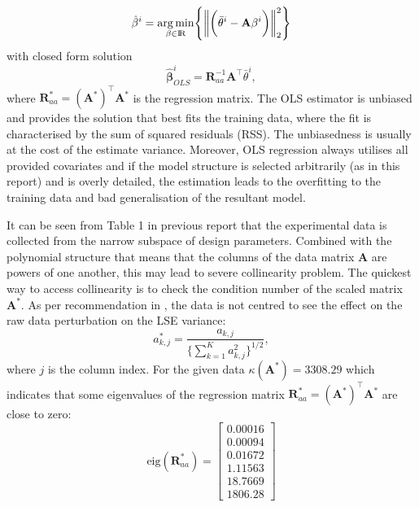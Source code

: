 \documentclass[a4paper,11pt,twoside]{article}
\newcommand{\norm}[1]{\left\lVert#1\right\rVert}
\DeclareMathOperator{\R}{\rm I\!R}
\theoremstyle{mytheoremstyle}
\begin{document}
\begin{equation}
\hat{\mathbf{\beta}}^i = \underset{\beta \in \R}{\arg \min} \Biggl\{\norm{ \biggl(\bar{\theta}^i - \mathbf{A} \mathbf{\beta}^i \biggr) }^{2}_{2}\Biggr\}
\end{equation}
with closed form solution
\begin{equation}
\hat{\mathbf{\beta}}^{i}_{OLS} = \mathbf{R}^{-1}_{aa} \mathbf{A}^{\top}\bar{\theta}^i,  
\end{equation} 
where $\mathbf{R}^{\ast}_{aa} = (\mathbf{A}^\ast)^{\top}\mathbf{A}^\ast$ is the regression matrix. The OLS estimator is unbiased and provides the solution that best fits the training data, where the fit is characterised by the sum of squared residuals (RSS). The unbiasedness is usually at the cost of the estimate variance. Moreover, OLS regression always utilises all provided covariates and if the model structure is selected arbitrarily (as in this report) and is overly detailed, the estimation leads to the overfitting to the training data and bad generalisation of the resultant model.
\par It can be seen from Table 1 in previous report that the experimental data is collected from the narrow subspace of design parameters. Combined with the polynomial structure that means that the columns of the data matrix $\mathbf{A} $ are powers of one another, this may lead to severe collinearity problem. The quickest way to access collinearity is to check the condition number of the scaled matrix $\mathbf{A}^\ast$. As per recommendation in \cite{Seber2003}, the data is not centred to see the effect on the raw data perturbation on the LSE variance:
\begin{equation*}
a^{\ast}_{k,j} = \frac{a_{k,j}}{\Big\{ \sum^{K}_{k=1} a^{2}_{k,j}\Big\}^{1/2}}, 
\end{equation*}
where $j$ is the column index.
For the given data $\kappa(\mathbf{A}^\ast) = 3308.29$ which indicates that some eigenvalues of the regression matrix $\mathbf{R}^{\ast}_{aa} = (\mathbf{A}^\ast)^{\top}\mathbf{A}^\ast$ are close to zero:
\begin{equation*}
\text{eig}(\mathbf{R}^{\ast}_{aa}) = \left[\begin{array}{r}
0.00016 \\
0.00094\\
0.01672\\
1.11563\\
18.7669\\
1806.28
\end{array}\right]
\end{equation*}
\end{document}
